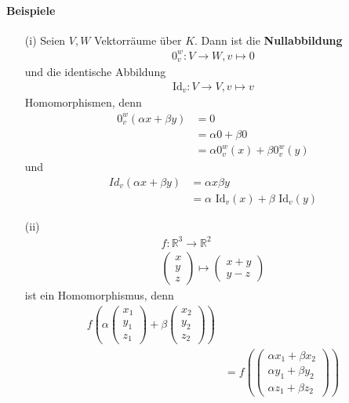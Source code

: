 \documentclass[11pt]{report}
\newcommand*\Zb[1] {\mathbb{#1}}
\newcommand*\f[1] {\textbf{#1}}
\begin{document}
\paragraph{Beispiele}
\begin{itemize}
 \item[(i)] Seien $V, W$ Vektorräume über $K$. Dann ist die \f{Nullabbildung}
\begin{align}
 0_{v}^{w}: V \rightarrow W, v \mapsto 0
\end{align}
und die identische Abbildung
\begin{align}
 \text{Id}_v: V \rightarrow V, v \mapsto v
\end{align}
Homomorphismen, denn 
\begin{align}
 0_{v}^{w}(\alpha x + \beta y) &= 0 \\
 &= \alpha 0 + \beta 0 \\
 &= \alpha 0_{v}^{w}(x) + \beta 0_{v}^{w}(y)
\end{align}
und
\begin{align}
 Id_{v}(\alpha x + \beta y) &= \alpha x \beta y \\
 &= \alpha \text{ Id}_v(x) + \beta\text{ Id}_v(y)
\end{align}
\item[(ii)] 
\begin{align}
 f: \Zb{R}^3 \rightarrow \Zb{R}^2 \\
\begin{pmatrix}
 x \\ y \\ z
\end{pmatrix}
\mapsto \begin{pmatrix} x +  y \\ y - z \end{pmatrix}
\end{align}
ist ein Homomorphismus, denn
\begin{align}
 f(\alpha \begin{pmatrix} x_1 \\ y_1 \\ z_1\end{pmatrix} + \beta \begin{pmatrix} x_2 \\ y_2 \\ z_2\end{pmatrix}) \\
 &= f(\begin{pmatrix} \alpha x_1 + \beta x_2 \\  \alpha y_1 + \beta y_2 \\ \alpha z_1 + \beta z_2 \end{pmatrix}) \\

\end{align}
\end{itemize}
\end{document}
